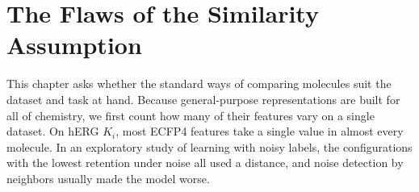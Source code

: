 \chapter{The Flaws of the Similarity Assumption}\label{chap:flaws}

This chapter asks whether the standard ways of comparing molecules suit the dataset and task at hand. Because general-purpose representations are built for all of chemistry, we first count how many of their features vary on a single dataset. On hERG $K_i$, most ECFP4 features take a single value in almost every molecule. In an exploratory study of learning with noisy labels, the configurations with the lowest retention under noise all used a distance, and noise detection by neighbors usually made the model worse.




